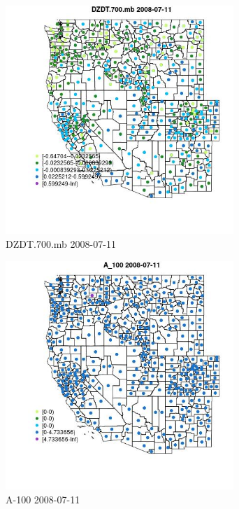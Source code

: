 \begin{figure} 
\centering  
\includegraphics[width=0.77\textwidth]{Code_Outputs/df_report_ML_predictors_CountyCentroid_Locations_Dates_2008-01-01to2018-12-31_MapObsDZDT700mb2008-07-11.jpg} 
\caption{\label{fig:df_report_ML_predictors_CountyCentroid_Locations_Dates_2008-01-01to2018-12-31MapObsDZDT700mb2008-07-11}DZDT.700.mb 2008-07-11} 
\end{figure} 
 

\clearpage 

\begin{figure} 
\centering  
\includegraphics[width=0.77\textwidth]{Code_Outputs/df_report_ML_predictors_CountyCentroid_Locations_Dates_2008-01-01to2018-12-31_MapObsA_1002008-07-11.jpg} 
\caption{\label{fig:df_report_ML_predictors_CountyCentroid_Locations_Dates_2008-01-01to2018-12-31MapObsA_1002008-07-11}A-100 2008-07-11} 
\end{figure} 
 

